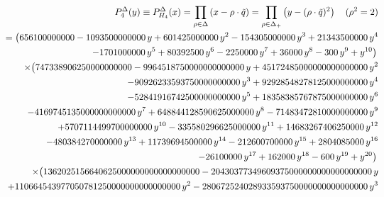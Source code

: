 \documentclass[a4paper,12pt]{article}
\begin{document}
\begin{eqnarray}
   &&\hspace{-11mm}\;\;P_{4}^{\Delta}(y)\equiv P_{H_4}^{\Delta}(x)=
   \prod_{\rho\in{\Delta}}\left(x-\rho\cdot\tilde{q}\right)
   =\prod_{\rho\in{\Delta_{+}}}\left(y-(\rho\cdot\tilde{q})^2\right)
   \quad (\rho^2=2)\nonumber\\
%
   &&\hspace{-11mm}=
   \bigl( 656100000000 - 1093500000000\,y + 601425000000\,y^2 -
      154305000000\,y^3 + 21343500000\,y^4 \nonumber\\
   &&\hspace{-11mm}\;\;- 1701000000\,y^5 + 80392500\,y^6 -
      2250000\,y^7 + 36000\,y^8 - 300\,y^9 + y^{10} \bigr) \,\nonumber\\
   &&\hspace{-11mm}\times
   \bigl( 747338906250000000000 - 9964518750000000000000\,y +
      45172485000000000000000\,y^2 \nonumber\\
   &&\hspace{-11mm}\;\;- 90926233593750000000000\,y^3 +
      92928548278125000000000\,y^4 \nonumber\\
   &&\hspace{-11mm}\;\;- 52841916742500000000000\,y^5 +
      18358385767875000000000\,y^6 \nonumber\\
   &&\hspace{-11mm}\;\;- 4169745135000000000000\,y^7 +
      648844128590625000000\,y^8 - 71483472810000000000\,y^9 \nonumber\\
   &&\hspace{-11mm}\;\;
   + 5707114499700000000\,y^{10} - 335580296625000000\,y^{11} +
      14683267406250000\,y^{12} \nonumber\\
   &&\hspace{-11mm}\;\;- 480384270000000\,y^{13} +
      11739694500000\,y^{14} - 212600700000\,y^{15} + 2804085000\,y^{16}
   \nonumber\\
   &&\hspace{-11mm}\;\;
   - 26100000\,y^{17} + 162000\,y^{18} - 600\,y^{19} + y^{20} \bigr) \,
   \nonumber\\
   &&\hspace{-11mm}\times\bigl( 1362025156640625000000000000000000 -
      20430377349609375000000000000000000\,y \nonumber\\
   &&\hspace{-11mm}\;\;+ 110664543977050781250000000000000000\,y^2 -
      280672524028933593750000000000000000\,y^3 \nonumber\\

\end{eqnarray}
\end{document}
